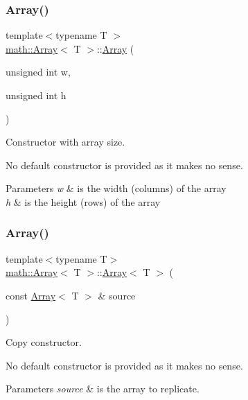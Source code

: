 \subsubsection{\texorpdfstring{Array()}{Array()}\hspace{0.1cm}{\footnotesize\ttfamily [1/2]}}
{\footnotesize\ttfamily template$<$typename T $>$ \\
\hyperlink{classmath_1_1_array}{math\+::\+Array}$<$ T $>$\+::\hyperlink{classmath_1_1_array}{Array} (\begin{DoxyParamCaption}\item[{unsigned int}]{w,  }\item[{unsigned int}]{h }\end{DoxyParamCaption})}

Constructor with array size.

No default constructor is provided as it makes no sense.


\begin{DoxyParams}{Parameters}
{\em w} & is the width (columns) of the array \\
\hline
{\em h} & is the height (rows) of the array \\
\hline
\end{DoxyParams}
\mbox{\label{classmath_1_1_array_ac90e20c0774ab33f14e23e8f59117223}} 
\subsubsection{\texorpdfstring{Array()}{Array()}\hspace{0.1cm}{\footnotesize\ttfamily [2/2]}}
{\footnotesize\ttfamily template$<$typename T$>$ \\
\hyperlink{classmath_1_1_array}{math\+::\+Array}$<$ T $>$\+::\hyperlink{classmath_1_1_array}{Array}$<$ T $>$ (\begin{DoxyParamCaption}\item[{const \hyperlink{classmath_1_1_array}{Array}$<$ T $>$ \&}]{source }\end{DoxyParamCaption})}

Copy constructor.

No default constructor is provided as it makes no sense.


\begin{DoxyParams}{Parameters}
{\em source} & is the array to replicate. \\
\hline
\end{DoxyParams}
\mbox{\label{classmath_1_1_array_a68c3eb186d34387d63908b78937d7aee}} 
